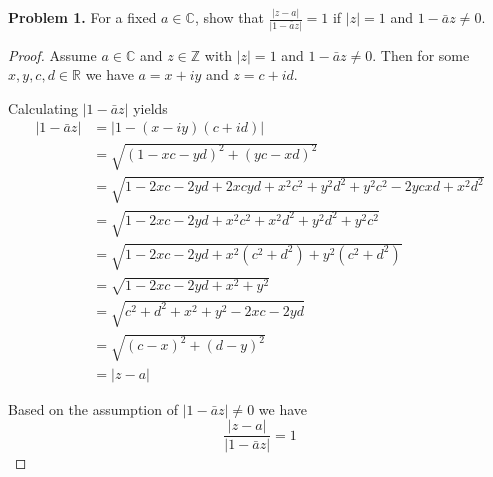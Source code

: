 \documentclass[letter,12pt]{article}
\date{\today}
\begin{document}
\pagestyle{fancy}
\begin{tcolorbox}
    \textbf{Problem 1.} For a fixed $a\in \mathbb{C}$, show that $\frac{|z-a|}{|1-\bar{a}z|}=1$ if $|z|=1$ and $1-\bar{a}z\not = 0$.

\end{tcolorbox}

\begin{proof}
    Assume $a\in \mathbb{C}$ and $z\in \mathbb{Z}$ with $|z|=1$ and $1-\bar{a}z\not = 0$. Then for some $x,y,c,d\in \mathbb{R}$ we have $a=x+iy$ and $z=c+id$.

    Calculating $|1-\bar{a}z|$ yields \begin{align}
        |1-\bar{a}z| & = |1-(x-iy)(c+id)|                                         \\
                     & = \sqrt{(1-xc-yd)^2+(yc-xd)^2}                             \\
                     & = \sqrt{1-2xc-2yd+2xcyd+x^2c^2+y^2d^2+y^2c^2-2ycxd+x^2d^2} \\
                     & =\sqrt{1-2xc-2yd+x^2c^2+x^2d^2+y^2d^2+y^2c^2}              \\
                     & =\sqrt{1-2xc-2yd+x^2(c^2+d^2)+y^2(c^2+d^2)}                \\
                     & =\sqrt{1-2xc-2yd+x^2+y^2}                                  \\
                     & =\sqrt{c^2+d^2+x^2+y^2-2xc-2yd}                            \\
                     & =\sqrt{(c-x)^2+(d-y)^2}                                    \\
                     & =|z-a|
    \end{align}

    Based on the assumption of $|1-\bar{a}z|\not = 0$ we have $$\frac{|z-a|}{|1-\bar{a}z|}=1$$







\end{proof}
\end{document}
